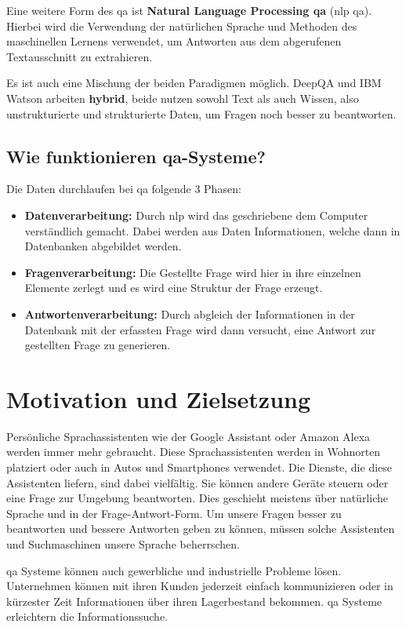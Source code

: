\documentclass[
        ngerman,
        paper=a4,
        numbers=noendperiod,
]{scrreprt}
\begin{document}
Eine weitere Form des \ac{qa} ist \textbf{Natural Language Processing \ac{qa}} (\ac{nlp}  \ac{qa}). Hierbei wird die Verwendung der natürlichen Sprache und Methoden des maschinellen Lernens verwendet, um Antworten aus dem abgerufenen Textausschnitt zu extrahieren.

Es ist auch eine Mischung der beiden Paradigmen möglich. DeepQA und IBM Watson arbeiten \textbf{hybrid}, beide nutzen sowohl Text als auch Wissen, also unstrukturierte und strukturierte Daten, um Fragen noch besser zu beantworten.





\section{Wie funktionieren \ac{qa}-Systeme?}
Die Daten durchlaufen bei \ac{qa} folgende 3 Phasen:
\begin{itemize}
\item \textbf{Datenverarbeitung:} Durch \ac{nlp} wird das geschriebene dem Computer verständlich gemacht. Dabei werden aus Daten Informationen, welche dann in Datenbanken abgebildet werden.
\item \textbf{Fragenverarbeitung:} Die Gestellte Frage wird hier in ihre einzelnen Elemente zerlegt und es wird eine Struktur der Frage erzeugt.
\item \textbf{Antwortenverarbeitung:} Durch abgleich der Informationen in der Datenbank mit der erfassten Frage wird dann versucht, eine Antwort zur gestellten Frage zu generieren.
\end{itemize}


\chapter{Motivation und Zielsetzung}
Persönliche Sprachassistenten wie der Google Assistant oder Amazon Alexa werden immer mehr gebraucht. Diese Sprachassistenten werden in Wohnorten platziert oder auch in Autos und Smartphones verwendet. Die Dienste, die diese Assistenten liefern, sind dabei vielfältig. Sie können andere Geräte steuern oder eine Frage zur Umgebung beantworten. Dies geschieht meistens über natürliche Sprache und in der Frage-Antwort-Form. Um unsere Fragen besser zu beantworten und bessere Antworten geben zu können, müssen solche Assistenten und Suchmaschinen unsere Sprache beherrschen. 

\ac{qa} Systeme können auch gewerbliche und industrielle Probleme lösen. Unternehmen können mit ihren Kunden jederzeit einfach kommunizieren oder in kürzester Zeit Informationen über ihren Lagerbestand bekommen. \ac{qa} Systeme erleichtern die Informationssuche.
\end{document}
